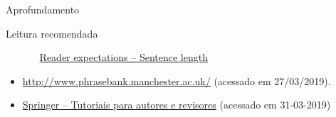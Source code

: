 \documentclass{beamer}
\begin{document}
\begin{frame}{Aprofundamento}
\begin{block}{Leitura recomendada}
\begin{itemize}
\begin{itemize}
        \href{https://web.archive.org/web/20150512003347/http://www.edanzediting.com/blog/reader_expectations_sentence_length}
        {Reader expectations -- Sentence length}
      \end{itemize}
    \item
      \url{http://www.phrasebank.manchester.ac.uk/} {\tiny (acessado em 27/03/2019)}.
    \item
      \href{https://www.springer.com/br/authors-editors/authorandreviewertutorials/writinginenglish/avoiding-common-language-issues/12012044}
      {Springer -- Tutoriais para autores e revisores} {\tiny(acessado em 31-03-2019)}
    \end{itemize}
  \end{block}
\end{frame}
\end{document}
